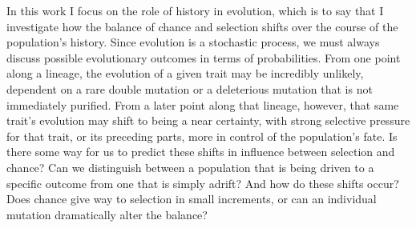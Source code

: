 In this work I focus on the role of history in evolution, which is to say that I investigate how the balance of chance and selection shifts over the course of the population's history. 
Since evolution is a stochastic process, we must always discuss possible evolutionary outcomes in terms of probabilities. 
From one point along a lineage, the evolution of a given trait may be incredibly unlikely, dependent on a rare double mutation or a deleterious mutation that is not immediately purified.
From a later point along that lineage, however, that same trait's evolution may shift to being a near certainty, with strong selective pressure for that trait, or its preceding parts, more in control of the population's fate.
Is there some way for us to predict these shifts in influence between selection and chance?
Can we distinguish between a population that is being driven to a specific outcome from one that is simply adrift?
And how do these shifts occur?
Does chance give way to selection in small increments, or can an individual mutation dramatically alter the balance?